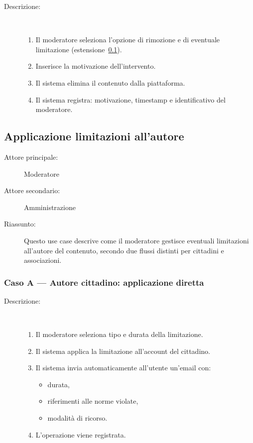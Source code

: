 \begin{ucscope}
\begin{description}
	\item[Descrizione:]~
	\begin{enumerate}
		\item Il moderatore seleziona l’opzione di rimozione e di eventuale limitazione (estensione~\ref{uc:modlimitazioni}).
		\item Inserisce la motivazione dell’intervento.
		\item Il sistema elimina il contenuto dalla piattaforma.
		\item Il sistema registra: motivazione, timestamp e identificativo del moderatore.
	\end{enumerate}
\end{description}

\subsection{Applicazione limitazioni all’autore} \label{uc:modlimitazioni}

\begin{description}
	\item[Attore principale:] Moderatore
	\item[Attore secondario:] Amministrazione

	\item[Riassunto:]
	Questo use case descrive come il moderatore gestisce eventuali limitazioni all’autore del contenuto, secondo due flussi distinti per cittadini e associazioni.
\end{description}

\subsubsection*{Caso A — Autore cittadino: applicazione diretta}

\begin{description}
	\item[Descrizione:]~
	\begin{enumerate}
		\item Il moderatore seleziona tipo e durata della limitazione.
		\item Il sistema applica la limitazione all’account del cittadino.
		\item Il sistema invia automaticamente all’utente un’email con:
		\begin{itemize}
			\item durata,
			\item riferimenti alle norme violate,
			\item modalità di ricorso.
		\end{itemize}
		\item L’operazione viene registrata.
	\end{enumerate}
\end{description}


\end{ucscope}

